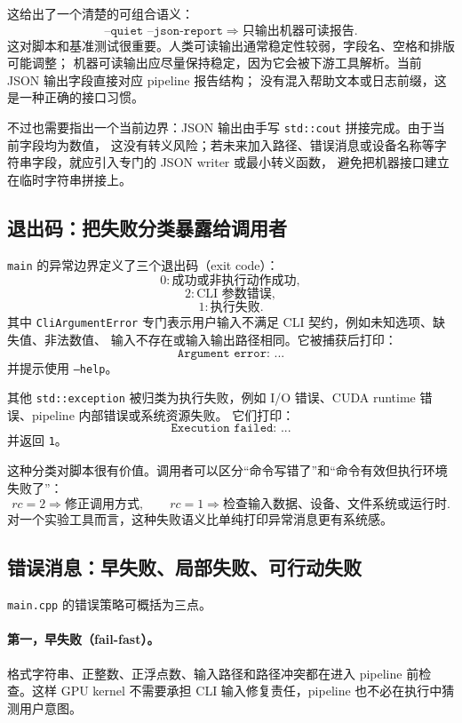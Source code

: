 这给出了一个清楚的可组合语义：
\[
    \texttt{--quiet --json-report}
    \Rightarrow
    \text{只输出机器可读报告}.
\]
这对脚本和基准测试很重要。人类可读输出通常稳定性较弱，字段名、空格和排版可能调整；
机器可读输出应尽量保持稳定，因为它会被下游工具解析。当前 JSON 输出字段直接对应 pipeline 报告结构；
没有混入帮助文本或日志前缀，这是一种正确的接口习惯。

不过也需要指出一个当前边界：JSON 输出由手写 \texttt{std::cout} 拼接完成。由于当前字段均为数值，
这没有转义风险；若未来加入路径、错误消息或设备名称等字符串字段，就应引入专门的 JSON writer 或最小转义函数，
避免把机器接口建立在临时字符串拼接上。

\subsection{退出码：把失败分类暴露给调用者}

\texttt{main} 的异常边界定义了三个退出码（exit code）：
\[
    0:\text{成功或非执行动作成功},
\]
\[
    2:\text{CLI 参数错误},
\]
\[
    1:\text{执行失败}.
\]
其中 \texttt{CliArgumentError} 专门表示用户输入不满足 CLI 契约，例如未知选项、缺失值、非法数值、
输入不存在或输入输出路径相同。它被捕获后打印：
\[
    \texttt{Argument error: ...}
\]
并提示使用 \texttt{--help}。

其他 \texttt{std::exception} 被归类为执行失败，例如 I/O 错误、CUDA runtime 错误、pipeline 内部错误或系统资源失败。
它们打印：
\[
    \texttt{Execution failed: ...}
\]
并返回 \texttt{1}。

这种分类对脚本很有价值。调用者可以区分“命令写错了”和“命令有效但执行环境失败了”：
\[
    rc=2 \Rightarrow \text{修正调用方式},
    \qquad
    rc=1 \Rightarrow \text{检查输入数据、设备、文件系统或运行时}.
\]
对一个实验工具而言，这种失败语义比单纯打印异常消息更有系统感。

\subsection{错误消息：早失败、局部失败、可行动失败}

\texttt{main.cpp} 的错误策略可概括为三点。

\paragraph{第一，早失败（fail-fast）。}
格式字符串、正整数、正浮点数、输入路径和路径冲突都在进入 pipeline 前检查。这样 GPU kernel 不需要承担
CLI 输入修复责任，pipeline 也不必在执行中猜测用户意图。

